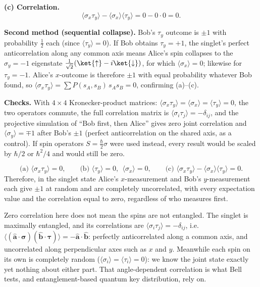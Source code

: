 \begin{solutionbox}
\textbf{(c) Correlation.}
\[
\langle\sigma_x\tau_y\rangle-\langle\sigma_x\rangle\langle\tau_y\rangle=0-0\cdot0=0 .
\]

\textbf{Second method (sequential collapse).} Bob's $\tau_y$ outcome is $\pm1$ with probability $\tfrac12$ each (since $\langle\tau_y\rangle=0$). If Bob obtains $\tau_y=+1$, the singlet's perfect anticorrelation along any common axis means Alice's spin collapses to the $\sigma_y=-1$ eigenstate $\frac{1}{\sqrt2}(\ket{\uparrow}-i\ket{\downarrow})$, for which $\langle\sigma_x\rangle=0$; likewise for $\tau_y=-1$. Alice's $x$-outcome is therefore $\pm1$ with equal probability whatever Bob found, so $\langle\sigma_x\tau_y\rangle=\sum P(s_A,s_B)\,s_As_B=0$, confirming (a)--(c).

\textbf{Checks.} With $4\times4$ Kronecker-product matrices: $\langle\sigma_x\tau_y\rangle=\langle\sigma_x\rangle=\langle\tau_y\rangle=0$, the two operators commute, the full correlation matrix is $\langle\sigma_i\tau_j\rangle=-\delta_{ij}$, and the projective simulation of ``Bob first, then Alice'' gives zero joint correlation and $\langle\sigma_y\rangle=\mp1$ after Bob's $\pm1$ (perfect anticorrelation on the shared axis, as a control). If spin operators $S=\frac\hbar2\sigma$ were used instead, every result would be scaled by $\hbar/2$ or $\hbar^2/4$ and would still be zero.
\end{solutionbox}

\begin{answerbox}
\[
\text{(a) }\langle\sigma_x\tau_y\rangle=0,\qquad\text{(b) }\langle\tau_y\rangle=0,\ \ \langle\sigma_x\rangle=0,\qquad\text{(c) }\langle\sigma_x\tau_y\rangle-\langle\sigma_x\rangle\langle\tau_y\rangle=0 .
\]
Therefore, in the singlet state Alice's $x$-measurement and Bob's $y$-measurement each give $\pm1$ at random and are completely uncorrelated, with every expectation value and the correlation equal to zero, regardless of who measures first.
\end{answerbox}

\begin{insightbox}
Zero correlation here does not mean the spins are not entangled. The singlet is maximally entangled, and its correlations are $\langle\sigma_i\tau_j\rangle=-\delta_{ij}$, i.e.\ $\langle(\hat{\mathbf a}\cdot\boldsymbol\sigma)(\hat{\mathbf b}\cdot\boldsymbol\tau)\rangle=-\hat{\mathbf a}\cdot\hat{\mathbf b}$: perfectly anticorrelated along a common axis, and uncorrelated along perpendicular axes such as $x$ and $y$. Meanwhile each spin on its own is completely random ($\langle\sigma_i\rangle=\langle\tau_i\rangle=0$): we know the joint state exactly yet nothing about either part. That angle-dependent correlation is what Bell tests, and entanglement-based quantum key distribution, rely on.
\end{insightbox}
